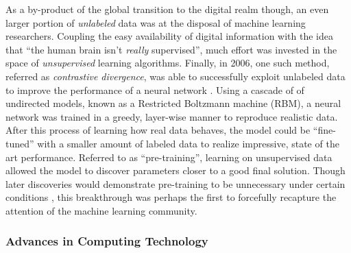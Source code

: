 As a by-product of the global transition to the digital realm though, an even larger portion of \emph{unlabeled} data was at the disposal of machine learning researchers.
Coupling the easy availability of digital information with the idea that ``the human brain isn't \emph{really} supervised'', much effort was invested in the space of \emph{unsupervised} learning algorithms. %
Finally, in 2006, one such method, referred as \emph{contrastive divergence}, was able to successfully exploit unlabeled data to improve the performance of a neural network \cite{Hinton2006Fast}.
Using a cascade of of undirected models, known as a Restricted Boltzmann machine (RBM), a neural network was trained in a greedy, layer-wise manner to reproduce realistic data.
After this process of learning how real data behaves, the model could be ``fine-tuned'' with a smaller amount of labeled data to realize impressive, state of the art performance.
Referred to as ``pre-training'', learning on unsupervised data allowed the model to discover parameters closer to a good final solution.
Though later discoveries would demonstrate pre-training to be unnecessary under certain conditions \cite{Zeiler2013Rectified}, this breakthrough was perhaps the first to forcefully recapture the attention of the machine learning community.



\subsubsection{Advances in Computing Technology}
\label{subsubsec:hardware}

